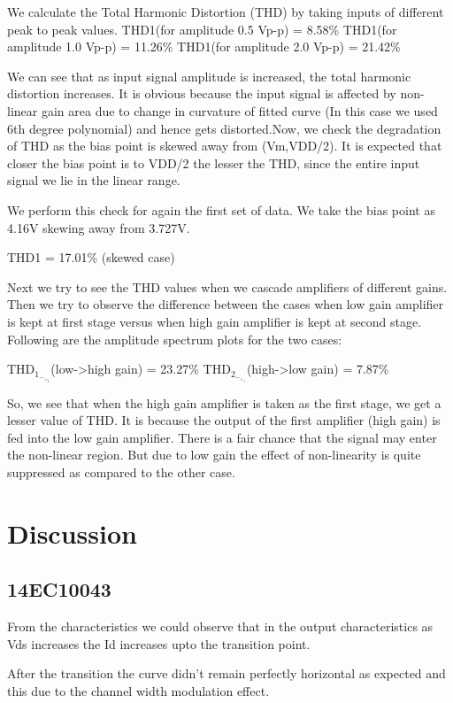 \documentclass[12pt]{article}
\begin{document}
We calculate the Total Harmonic Distortion (THD) by taking inputs of different peak to peak values.
THD1(for amplitude 0.5 Vp-p) = 8.58\%
THD1(for amplitude 1.0 Vp-p) = 11.26\%
THD1(for amplitude 2.0 Vp-p) = 21.42\%

We can see that as input signal amplitude is increased, the total harmonic distortion increases. It is obvious because the input signal is affected by non-linear gain area due to change in curvature of fitted curve (In this case we used 6th
degree polynomial) and hence gets distorted.Now, we check the degradation of THD as the bias point is skewed away from (Vm,VDD/2). It is expected that closer the bias point is to VDD/2 the lesser the THD, since the entire input signal we lie in the linear range.

We perform this check for again the first set of data. We take the bias point as 4.16V skewing away from 3.727V.

THD1 = 17.01\%
(skewed case)

Next we try to see the THD values when we cascade amplifiers of different gains. Then we try to observe the difference between the cases when low gain amplifier is kept at first stage versus when high gain amplifier is kept at second stage. Following are the amplitude spectrum plots for the two cases:

THD$_1_-_>_2$(low->high gain) = 23.27\% 
THD$_2_-_>_1$(high->low gain) = 7.87\%

So, we see that when the high gain amplifier is taken as the first stage, we get a lesser value of THD. It is because the output of the first amplifier (high gain) is fed into the low gain amplifier. There is a fair chance that the signal may enter the non-linear region. But due to low gain the effect of non-linearity is quite suppressed as compared to the other case.

\section*{Discussion}

\subsection*{14EC10043}
From the characteristics we could observe that in the output characteristics as Vds increases the Id increases upto the transition point.

After the transition the curve didn’t remain perfectly horizontal as expected and this due to the channel width modulation effect.
\end{document}
